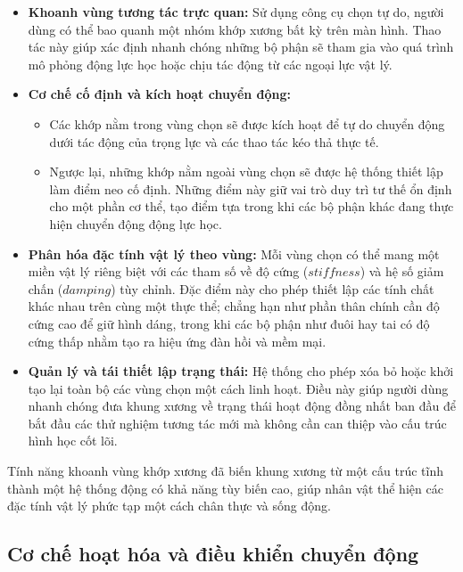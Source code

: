 \documentclass{report}
\begin{document}
\begin{itemize} 
    \item \textbf{Khoanh vùng tương tác trực quan:} Sử dụng công cụ chọn tự do, người dùng có thể bao quanh một nhóm khớp xương bất kỳ trên màn hình. Thao tác này giúp xác định nhanh chóng những bộ phận sẽ tham gia vào quá trình mô phỏng động lực học hoặc chịu tác động từ các ngoại lực vật lý.

    \item \textbf{Cơ chế cố định và kích hoạt chuyển động:} 
    \begin{itemize}
        \item Các khớp nằm trong vùng chọn sẽ được kích hoạt để tự do chuyển động dưới tác động của trọng lực và các thao tác kéo thả thực tế.
        \item Ngược lại, những khớp nằm ngoài vùng chọn sẽ được hệ thống thiết lập làm điểm neo cố định. Những điểm này giữ vai trò duy trì tư thế ổn định cho một phần cơ thể, tạo điểm tựa trong khi các bộ phận khác đang thực hiện chuyển động động lực học.
    \end{itemize}

    \item \textbf{Phân hóa đặc tính vật lý theo vùng:} Mỗi vùng chọn có thể mang một miền vật lý riêng biệt với các tham số về độ cứng ($stiffness$) và hệ số giảm chấn ($damping$) tùy chỉnh. Đặc điểm này cho phép thiết lập các tính chất khác nhau trên cùng một thực thể; chẳng hạn như phần thân chính cần độ cứng cao để giữ hình dáng, trong khi các bộ phận như đuôi hay tai có độ cứng thấp nhằm tạo ra hiệu ứng đàn hồi và mềm mại.

    \item \textbf{Quản lý và tái thiết lập trạng thái:} Hệ thống cho phép xóa bỏ hoặc khởi tạo lại toàn bộ các vùng chọn một cách linh hoạt. Điều này giúp người dùng nhanh chóng đưa khung xương về trạng thái hoạt động đồng nhất ban đầu để bắt đầu các thử nghiệm tương tác mới mà không cần can thiệp vào cấu trúc hình học cốt lõi.
\end{itemize}

Tính năng khoanh vùng khớp xương đã biến khung xương từ một cấu trúc tĩnh thành một hệ thống động có khả năng tùy biến cao, giúp nhân vật thể hiện các đặc tính vật lý phức tạp một cách chân thực và sống động.

\subsection{Cơ chế hoạt hóa và điều khiển chuyển động}
\end{document}

